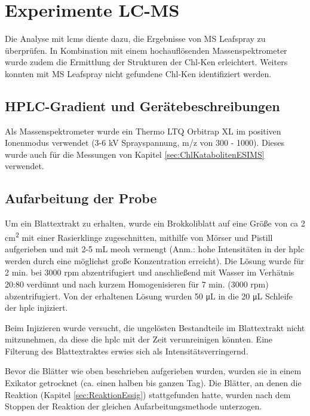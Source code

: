 \chapter{Experimente LC-MS} 

Die Analyse mit \gls{lcms} diente dazu, die Ergebnisse von MS Leafspray zu überprüfen. In Kombination mit einem hochauflösenden Massenspektrometer wurde zudem die Ermittlung der Strukturen der \gls{Chl-K}en erleichtert. Weiters konnten mit MS Leafspray nicht gefundene \gls{Chl-K}en identifiziert werden. \\

\section{HPLC-Gradient und Gerätebeschreibungen} \label{sec:HPLCAufarbeitungderProbe} 

Als Massenspektrometer wurde ein Thermo LTQ Orbitrap XL im positiven Ionenmodus verwendet (3-6 kV Sprayspannung, m/z von 300 - 1000). Dieses wurde auch für die Messungen von Kapitel \ref{sec:ChlKatabolitenESIMS} verwendet.

\section{Aufarbeitung der Probe} \label{sec:HPLCAufarbeitungderProbe}

Um ein Blattextrakt zu erhalten, wurde ein Brokkoliblatt auf eine Größe von \gls{ca} 2 \si{cm^{2}} mit einer Rasierklinge zugeschnitten, mithilfe von Mörser und Pistill aufgerieben und mit 2-5 mL \gls{meoh} vermengt (Anm.: hohe Intensitäten in der \gls{hplc} werden durch eine möglichst große Konzentration erreicht). Die Lösung wurde für 2 min. bei 3000 rpm abzentrifugiert und anschließend mit Wasser im Verhätnis 20:80 verdünnt und nach kurzem Homogenisieren für 7 min. (3000 rpm) abzentrifugiert. Von der erhaltenen Lösung wurden 50 \si{\uL} in die 20 \si{\uL} Schleife der \gls{hplc} injiziert. 

Beim Injizieren wurde versucht, die ungelösten Bestandteile im Blattextrakt nicht mitzunehmen, da diese die \gls{hplc} mit der Zeit verunreinigen könnten. Eine Filterung des Blattextraktes erwies sich als Intensitätsverringernd.

Bevor die Blätter wie oben beschrieben aufgerieben wurden, wurden sie in einem Exikator getrocknet (ca. einen halben bis ganzen Tag). Die Blätter, an denen die Reaktion (Kapitel \ref{sec:ReaktionEssig}) stattgefunden hatte, wurden nach dem Stoppen der Reaktion der gleichen Aufarbeitungsmethode unterzogen. 

